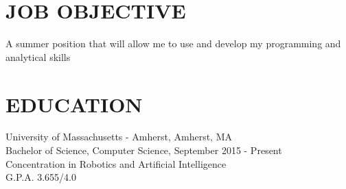 \documentclass{res}
\begin{document}
 

\address{\bf  PRESENT ADDRESS\\145 Commonwealth Avenue\\Amherst, MA 01003-9253\\(908) 902-2202}
\address{\bf PERMANENT ADDRESS \\ 117 Agress Road \\  Millstone, NJ 08510 \\  (908) 902-2202}
\begin{resume}
\section{JOB OBJECTIVE}          
    A summer position that will allow me to use and develop my programming and analytical skills       
    \vspace{-0.2in}   
\section{EDUCATION}          
    University of Massachusetts - Amherst, Amherst, MA  \\        
    Bachelor of Science, Computer Science, September 2015 - Present   \\       
    Concentration in Robotics and Artificial Intelligence       \\
    G.P.A. 3.655/4.0    
    \vspace{-0.2in}

\end{resume}
\end{document}

